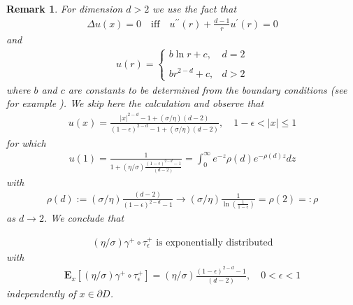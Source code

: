 \documentclass[11pt,a4paper]{article}
\newtheorem{remark}{Remark}[section]
\begin{document}
{\begin{remark}
\label{Rmk:regularityDomainPPPanyd}
For dimension $d>2$ we use the fact that 
\begin{align*}
\Delta u(x) = 0 \quad \textrm{iff} \quad  u^{\prime \prime}(r) + \frac{d-1}{r}  u^\prime(r) = 0
\end{align*}
and
\begin{align*}
u(r) = \left\lbrace
\begin{array}{ll}
\displaystyle b\ln r + c, & d=2\\
\\
\displaystyle b r^{2-d} + c, & d>2
\end{array}
\right .
\end{align*}
where $b$ and $c$ are constants to be determined from the boundary conditions (see for example \cite[Section 2.2.1]{EvansPDE}). We skip here the calculation and observe that
\begin{align*}
u(x) = \frac{|x|^{2-d} - 1 + (\sigma/\eta)(d-2)}{(1-\epsilon)^{2-d} - 1 + (\sigma/\eta) (d-2)}, \quad 1-\epsilon < |x| \leq 1
\end{align*}
for which
\begin{align*}
\displaystyle u(1) = \frac{1}{1 + (\eta/\sigma)\frac{(1-\epsilon)^{2-d} - 1}{(d-2)}} = \int_0^\infty e^{-z} \rho(d) e^{-\rho(d) z} dz
\end{align*}
with
\begin{align*}
\rho(d):= (\sigma/\eta) \frac{(d-2)}{(1-\epsilon)^{2-d} - 1} \to (\sigma/\eta) \frac{1}{\ln\left( \frac{1}{1-\epsilon} \right)} =\rho(2)=: \rho
\end{align*}
as $d \to 2$. We conclude that

\begin{align*}
(\eta/\sigma) \gamma^+\circ \tau^+_\epsilon \textrm{ is exponentially distributed} 
\end{align*}
with
\begin{align*}
\mathbf{E}_x[(\eta/\sigma) \gamma^+\circ \tau^+_\epsilon] = (\eta/\sigma) \frac{(1-\epsilon)^{2-d} - 1}{(d-2)}, \quad 0 < \epsilon < 1
\end{align*}
independently of $x \in \partial D$. 

\end{remark}

}
\end{document}
